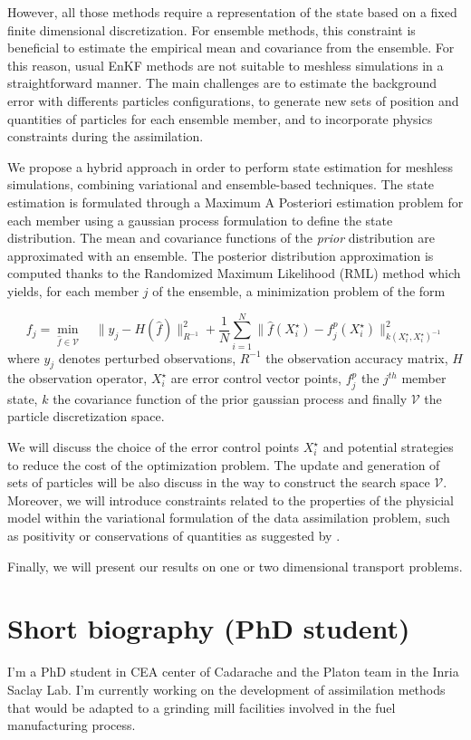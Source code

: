 \documentclass[a4paper,10pt,oneside]{article}
\newcommand{\xs}{X^\star}
\begin{document}
However, all those methods require a representation of the state based on a fixed finite dimensional discretization. For ensemble methods, this constraint is beneficial to estimate the empirical mean and covariance from the ensemble.
For this reason, usual EnKF methods are not suitable to meshless simulations in a straightforward manner.
The main challenges are to estimate the background error with differents particles configurations, to generate new sets of position and quantities of particles for each ensemble member, and to incorporate physics constraints during the assimilation.

We propose a hybrid approach in order to perform state estimation for meshless simulations, combining variational and ensemble-based techniques.
The state estimation is formulated through a Maximum A Posteriori estimation problem for each member using a gaussian process formulation to define the state distribution.
The mean and covariance functions of the \textit{prior} distribution are approximated with an ensemble. The posterior distribution approximation is computed thanks to the Randomized Maximum Likelihood (RML) method \cite{evensen_data_2022} which yields, for each member $j$ of the ensemble, a minimization problem of the form

\begin{equation*}
  f_{j} = \min_{\hat{f} \in \mathcal{V}} \quad \|y_j - H(\hat{f})\|_{R^{-1}}^2 + \frac{1}{N} \sum_{i=1}^N \|\hat{f}(\xs_i)- f^p_{j}(\xs_i)\|^2_{k(\xs_i,\xs_i)^{-1}}
\end{equation*}where $y_j$ denotes perturbed observations, $R^{-1}$ the observation accuracy matrix, $H$ the observation operator, $\xs_i$ are error control vector points, $f^p_{j}$ the $j^{th}$ member state, $k$ the covariance function of the prior gaussian process and finally $\mathcal{V}$ the particle discretization space.

We will discuss the choice of the error control points $\xs_i$ and potential strategies to reduce the cost of the optimization problem. The update and generation of sets of particles will be also discuss in the way to construct the search space $\mathcal{V}$. Moreover, we will introduce constraints related to the  properties of the physicial model within the variational formulation of the data assimilation problem, such as positivity or conservations of quantities as suggested by \cite{janjic_conservation_2014,albers_ensemble_2019}.

Finally, we will present our results on one or two dimensional transport problems.


\section*{Short biography (PhD student)}

I'm a PhD student in CEA center of Cadarache and the Platon team in the Inria Saclay Lab. I'm currently working on the development of assimilation methods that would be adapted to a grinding mill facilities involved in the fuel manufacturing process.



\end{document}
